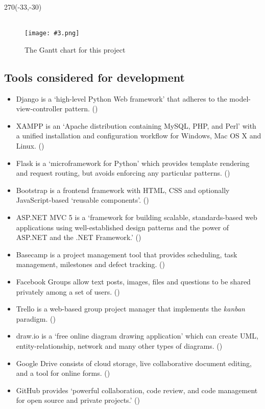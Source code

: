 \documentclass[a4paper,titlepage,12pt]{article}
\newcommand\figimg[4][\textwidth]{
	\begin{figure}
		\caption{#4}
		\label{fig:#2}
		\quad\\\texttt{[image: \#3.png]}
	\end{figure}
}
\begin{document}
\begin{landscape}
	\quad %
	\thispagestyle{empty}
	\begin{textblock}{270}(-33,-30)
		\figimg[280mm]{gantt}{gantt}
			{The Gantt chart for this project}
	\end{textblock}
\end{landscape}

\subsection{Tools considered for development}

\begin{itemize}
	\item Django is a `high-level Python Web framework' that adheres to the
	      model-view-controller pattern.
	      (\cite{Django2014})
	\item XAMPP is an `Apache distribution containing MySQL, PHP, and Perl'
	      with a unified installation and configuration workflow for
	      Windows, Mac OS X and Linux.
	      (\cite{ApacheFriends2014})
	\item Flask is a `microframework for Python' which provides template
	      rendering and request routing, but avoids enforcing any
	      particular patterns.
	      (\cite{Ronacher2014})
	\item Bootstrap is a frontend framework with HTML, CSS and optionally
	      JavaScript-based `reusable components'.
	      (\cite{Twitter2014})
	\item ASP.NET MVC 5 is a `framework for building scalable,
	      standards-based web applications using well-established design
	      patterns and the power of ASP.NET and the .NET Framework.'
	      (\cite{Microsoft2014})
	\item Basecamp is a project management tool that provides scheduling,
	      task management, milestones and defect tracking.
	      (\cite{37signals2004})
	\item Facebook Groups allow text posts, images, files and questions
	      to be shared privately among a set of users.
	      (\cite{Facebook2014})
	\item Trello is a web-based group project manager that implements the
	      \textit{kanban} paradigm.
	      (\cite{FogCreek2014})
	\item draw.io is a `free online diagram drawing application' which can
	      create UML, entity-relationship, network and many other types
	      of diagrams.
	      (\cite{JGraph2014})
	\item Google Drive consists of cloud storage, live collaborative
	      document editing, and a tool for online forms.
	      (\cite{Google2014})
	\item GitHub provides `powerful collaboration, code review, and code
	      management for open source and private projects.'
	      (\cite{GitHub2014})
\end{itemize}
\end{document}
